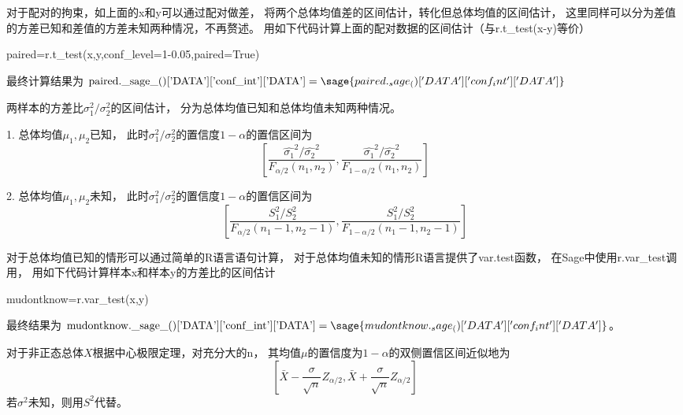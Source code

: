 对于配对的拘束，如上面的x和y可以通过配对做差，
将两个总体均值差的区间估计，转化但总体均值的区间估计，
这里同样可以分为差值的方差已知和差值的方差未知两种情况，不再赘述。
用如下代码计算上面的配对数据的区间估计（与r.t\_test(x-y)等价）
\begin{sageblock}
paired=r.t_test(x,y,conf_level=1-0.05,paired=True)
\end{sageblock}
最终计算结果为
$\textrm{paired.\_sage\_()['DATA']['conf\_int']['DATA']}=
\sage{paired._sage_()['DATA']['conf_int']['DATA']}$

两样本的方差比$\sigma_1^2/\sigma_2^2$的区间估计，
分为总体均值已知和总体均值未知两种情况。

1. 总体均值$\mu_1,\mu_2$已知，
此时$\sigma_1^2/\sigma_2^2$的置信度$1-\alpha$的置信区间为
\[\left[ \frac{\hat{\sigma_1}^2/\hat{\sigma_2}^2}{F_{\alpha/2}(n_1,n_2)},
\frac{\hat{\sigma_1}^2/\hat{\sigma_2}^2}{F_{1-\alpha/2}(n_1,n_2)} \right]\]

2. 总体均值$\mu_1,\mu_2$未知，
此时$\sigma_1^2/\sigma_2^2$的置信度$1-\alpha$的置信区间为
\[\left[\frac{S_1^2/S_2^2}{F_{\alpha/2}(n_1-1,n_2-1)},
\frac{S_1^2/S_2^2}{F_{1-\alpha/2}(n_1-1,n_2-1)}\right]\]

对于总体均值已知的情形可以通过简单的R语言语句计算，
对于总体均值未知的情形R语言提供了var.test函数，
在Sage中使用r.var\_test调用，
用如下代码计算样本x和样本y的方差比的区间估计
\begin{sageblock}
mudontknow=r.var_test(x,y)
\end{sageblock}
最终结果为
$\textrm{mudontknow.\_sage\_()['DATA']['conf\_int']['DATA']}=
\sage{mudontknow._sage_()['DATA']['conf_int']['DATA']}$。

对于非正态总体$X$根据中心极限定理，对充分大的n，
其均值$\mu$的置信度为$1-\alpha$的双侧置信区间近似地为
\[\left[ \bar{X}-\frac{\sigma}{\sqrt{n}}Z_{\alpha/2},\bar{X}+\frac{\sigma}{\sqrt{n}}Z_{\alpha/2} \right]\]
若$\sigma^2$未知，则用$S^2$代替。

